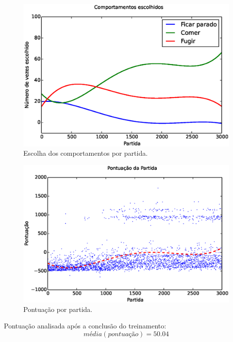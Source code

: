 \documentclass{beamer}
\begin{document}
\begin{frame}
\begin{figure}[h]
    \centering
    \includegraphics[width=\linewidth]{images/3_behaviors_small_map/chosen_behaviors_pol}
    \caption{Escolha dos comportamentos por partida.}
    \label{img:3ComportamentosMapaPequeno:ComportamentosEscolhidosPolinomio}
\end{figure}
\end{frame}


\begin{frame}
\begin{figure}[h]
    \centering
    \includegraphics[width=0.7\linewidth]{images/3_behaviors_small_map/match_scores____pol}
    \caption{Pontuação por partida.}
    \label{img:3ComportamentosMapaPequeno:PontuacaoPorPartida}
\end{figure}

Pontuação analisada após a conclusão do treinamento:
$$ \textit{média} \left( \textit{pontuação} \right) = 50.04 $$
\end{frame}
\end{document}
